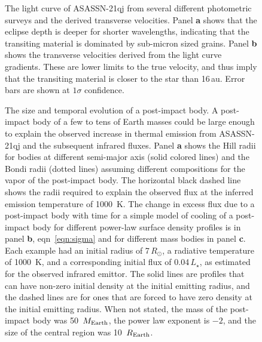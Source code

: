 \documentclass[sn-nature]{sn-jnl}%
\begin{document}
\begin{figure*}
\begin{centering}
      \caption{The light curve of ASASSN-21qj from several different photometric surveys and the derived transverse velocities.
      Panel {\bf a} shows that the eclipse depth is deeper for shorter wavelengths, indicating that the transiting material is dominated by sub-micron sized grains.
      Panel {\bf b} shows the  transverse velocities derived from the light curve gradients.
      These are lower limits to the true velocity, and thus imply that the transiting material is closer to the star than 16\,au.
      Error bars are shown at $1\sigma$ confidence.
      }
        \label{fig:eclipse_overview}
\end{centering}
\end{figure*}



\begin{figure}
\begin{centering}
\caption{The size and temporal evolution of a post-impact body.
%
A post-impact body of a few to tens of Earth masses could be large enough to explain the observed increase in thermal emission from ASASSN-21qj and the subsequent infrared fluxes.
%
Panel {\bf a} shows the Hill radii for bodies at different semi-major axis (solid colored lines) and the Bondi radii (dotted lines) assuming different compositions for the vapor of the post-impact body.
%
The horizontal black dashed line shows the radii required to explain the observed flux at the inferred emission temperature of 1000~K. 
%
The change in excess flux due to a post-impact body with time for a simple model of cooling of a post-impact body for different power-law surface density profiles is in panel {\bf b}, eqn~\ref{eqn:sigma} and for different mass bodies in panel {\bf c}.
%
Each example had an initial radius of 7\,$R_\odot$, a radiative temperature of 1000~K, and a corresponding initial flux of 0.04\,$L_\star$, as estimated for the observed infrared emittor.
%
The solid lines are profiles that can have non-zero initial density at the initial emitting radius, and the dashed lines are for ones that are forced to have zero density at the initial emitting radius.
%
When not stated, the mass of the post-impact body was 50~$M_{\rm Earth}$, the power law exponent is $-2$, and the size of the central region was 10~$R_{\rm Earth}$.
}
\label{fig:Hill_Bondi_R}
\end{centering}
\end{figure}
\end{document}
